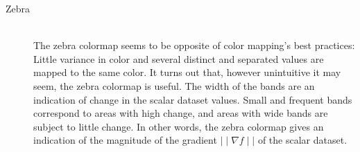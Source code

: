 \begin{description}
			\item[Zebra] ~\\
			The zebra colormap seems to be opposite of color mapping's best practices: Little variance in color and several distinct and separated values are mapped to the same color.
			It turns out that, however unintuitive it may seem, the zebra colormap is useful.
			The width of the bands are an indication of change in the scalar dataset values.
			Small and frequent bands correspond to areas with high change, and areas with wide bands are subject to little change.
			In other words, the zebra colormap gives an indication of the magnitude of the gradient \(\mid\mid\nabla f\mid\mid\) of the scalar dataset.\cite[p. 156]{telea2014data}
			\begin{figure}[htb]
				\centering
\end{figure}
\end{description}
